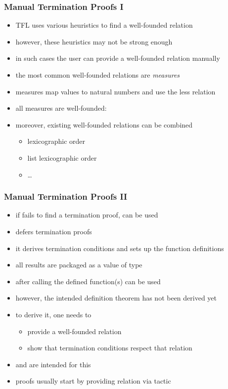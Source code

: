 \begin{frame}[fragile]
\frametitle{Manual Termination Proofs I}
\begin{itemize}
\item TFL uses various heuristics to find a well-founded relation
\item however, these heuristics may not be strong enough
\item in such cases the user can provide a well-founded relation manually
\item the most common well-founded relations are \emph{measures}
\item measures map values to natural numbers and use the less relation\\
\item all measures are well-founded:  
\item moreover, existing well-founded relations can be combined
\begin{itemize}
\item lexicographic order 
\item list lexicographic order 
\item \ldots
\end{itemize}
\end{itemize}

\end{frame}


\begin{frame}[fragile]
\frametitle{Manual Termination Proofs II}
\begin{itemize}
\item if  fails to find a termination proof,  can be used
\item {} defers termination proofs
\item it derives termination conditions and
  sets up the function definitions
\item all results are packaged as a value of type 
\item after calling  the defined function(s) can be used
\item however, the intended definition theorem has not been derived yet
\item to derive it, one needs to 
\begin{itemize}
\item provide a well-founded relation
\item show that termination conditions respect that relation
\end{itemize}
\item {} and  are intended for this
\item proofs usually start by providing relation via tactic 
\end{itemize}
\end{frame}



